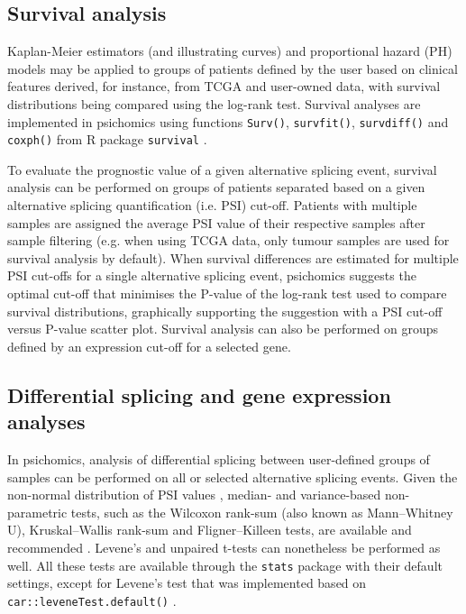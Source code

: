 \subsection{Survival analysis}

Kaplan-Meier estimators (and illustrating curves) \cite{rich:2010wt} and proportional hazard (PH) models \cite{spruance:2004vn} may be applied to groups of patients defined by the user based on clinical features derived, for instance, from TCGA and user-owned data, with survival distributions being compared using the log-rank test. Survival analyses are implemented in psichomics using functions \texttt{Surv()}, \texttt{survfit()}, \texttt{survdiff()} and \texttt{coxph()} from R package \texttt{survival} \cite{therneau:2000tk}.

To evaluate the prognostic value of a given alternative splicing event, survival analysis can be performed on groups of patients separated based on a given alternative splicing quantification (i.e. PSI) cut-off. Patients with multiple samples are assigned the average PSI value of their respective samples after sample filtering (e.g. when using TCGA data, only tumour samples are used for survival analysis by default). When survival differences are estimated for multiple PSI cut-offs for a single alternative splicing event, psichomics suggests the optimal cut-off that minimises the P-value of the log-rank test used to compare survival distributions, graphically supporting the suggestion with a PSI cut-off versus P-value scatter plot. Survival analysis can also be performed on groups defined by an expression cut-off for a selected gene.

\subsection{Differential splicing and gene expression analyses}

In psichomics, analysis of differential splicing between user-defined groups of samples can be performed on all or selected alternative splicing events. Given the non-normal distribution of PSI values \cite{kakaradov:2012wk,jia:2015wy}, median- and variance-based non-parametric tests, such as the Wilcoxon rank-sum (also known as Mann–Whitney U), Kruskal–Wallis rank-sum and Fligner–Killeen tests, are available and recommended \cite{barbaraCaravelaMScThesis}. Levene's and unpaired t-tests can nonetheless be performed as well. All these tests are available through the \texttt{stats} package with their default settings, except for Levene's test that was implemented based on \texttt{car::leveneTest.default()} \cite{}.

